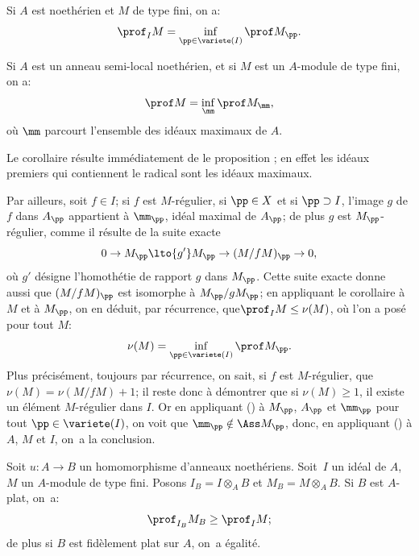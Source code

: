 \begin{proposition} \label{III.2.9}
Si $A$ est noeth\'erien et $M$ de type fini, on a:
\[
\prof_I M = \inf_{\pp \in \variete (I)} \prof M_\pp.
\]
\end{proposition}

\begin{corollaire} \label{III.2.10}
Si $A$ est un anneau semi-local noeth\'erien, et si $M$ est un $A$-module de type fini, on a:
\[
\prof M = \inf_\mm \prof M_\mm,
\]
o\`u $\mm $ parcourt l'ensemble des id\'eaux maximaux de $A$.
\end{corollaire}

Le corollaire r\'esulte imm\'ediatement de le proposition ; en effet les id\'eaux premiers qui contiennent le radical sont les id\'eaux maximaux.

Par ailleurs, soit $f\in I$; si $f$ est $M$-r\'egulier, si $\pp\in X$ et si $\pp\supset I$, l'image $g$ de $f$ dans $A_\pp$ appartient \`a $\mm_\pp$, id\'eal maximal de $A_\pp$; de plus $g$ est $M_\pp$-r\'egulier, comme il r\'esulte de la suite exacte
\begin{equation} \label{eq:III.2.3} 0 \to M_\pp \lto{g'} M_\pp \to (M/fM)_\pp \to 0,
\end{equation}
o\`u $g'$ d\'esigne l'homoth\'etie de rapport $g$ dans $M_\pp$. Cette suite exacte donne aussi que $(M/fM)_\pp$ est isomorphe \`a $M_\pp/gM_\pp$; en appliquant le corollaire  \`a $M$ et \`a $M_\pp$, on en d\'eduit, par r\'ecurrence, que\pageoriginale $\prof_I M\leq \nu(M)$, o\`u l'on a pos\'e pour tout $M$:
\[
\nu(M)=\inf_{\pp\in\variete(I)} \prof M_\pp.
\]
Plus pr\'ecis\'ement, toujours par r\'ecurrence, on sait, si $f$ est $M$-r\'egulier, que $\nu(M)= \nu(M/fM)+1$; il reste donc \`a d\'emontrer que si $\nu(M)\geq 1$, il existe un \'el\'ement $M$-r\'egulier dans $I$. Or en appliquant () \`a $M_\pp$, $A_\pp$ et $\mm_\pp$ pour tout $\pp\in \variete(I)$, on voit que $\mm_\pp \notin \Ass M_\pp$, donc, en appliquant () \`a $A$, $M$ et $I$, on~a la conclusion.

\enlargethispage{\baselineskip}%
\begin{proposition} \label{III.2.11}
Soit $u:A\to B$ un homomorphisme d'anneaux noeth\'eriens. Soit~$I$ un id\'eal de $A$, $M$ un $A$-module de type fini. Posons $I_B=I\otimes_A B$ et $M_B=M\otimes_A B$. Si $B$ est $A$-plat, on~a:
\[
\prof_{I_B} M_B \geq \prof_I M;
\]
de plus si $B$ est fid\`element plat sur $A$, on~a \'egalit\'e.
\end{proposition}

